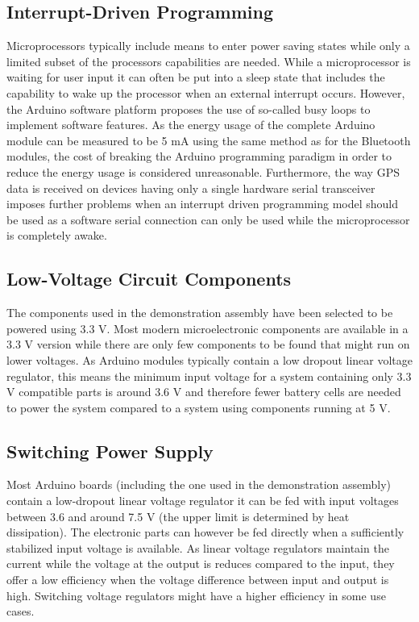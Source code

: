 \subsection{Interrupt-Driven Programming}
Microprocessors typically include means to enter power saving states while only a limited subset of the processors capabilities are needed. While a microprocessor is waiting for user input it can often be put into a sleep state that includes the capability to wake up the processor when an external interrupt occurs. However, the Arduino software platform proposes the use of so-called busy loops to implement software features. As the energy usage of the complete Arduino module can be measured to be 5 mA using the same method as for the Bluetooth modules, the cost of breaking the Arduino programming paradigm in order to reduce the energy usage is considered unreasonable. Furthermore, the way GPS data is received on devices having only a single hardware serial transceiver imposes further problems when an interrupt driven programming model should be used as a software serial connection can only be used while the microprocessor is completely awake.

\subsection{Low-Voltage Circuit Components}
The components used in the demonstration assembly have been selected to be powered using 3.3 V. Most modern microelectronic components are available in a 3.3 V version while there are only few components to be found that might run on lower voltages. As Arduino modules typically contain a low dropout linear voltage regulator, this means the minimum input voltage for a system containing only 3.3 V compatible parts is around 3.6 V and therefore fewer battery cells are needed to power the system compared to a system using components running at 5 V. 

\subsection{Switching Power Supply}
Most Arduino boards (including the one used in the demonstration assembly) contain a low-dropout linear voltage regulator it can be fed with input voltages between 3.6 and around 7.5 V (the upper limit is determined by heat dissipation). The electronic parts can however be fed directly when a sufficiently stabilized input voltage is available. As linear voltage regulators maintain the current while the voltage at the output is reduces compared to the input, they offer a low efficiency when the voltage difference between input and output is high. Switching voltage regulators might have a higher efficiency in some use cases.

